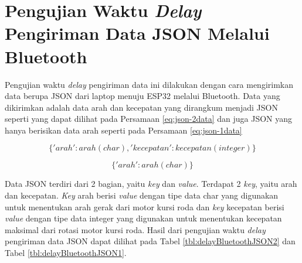 \section{Pengujian Waktu \emph{Delay} Pengiriman Data JSON Melalui Bluetooth}
\label{sec:delayBluetoothJSON}

Pengujian waktu \emph{delay} pengiriman data ini dilakukan dengan cara mengirimkan data berupa JSON dari laptop menuju ESP32 melalui Bluetooth. Data yang dikirimkan adalah data arah dan kecepatan yang dirangkum menjadi JSON seperti yang dapat dilihat pada Persamaan \ref{eq:json-2data} dan juga JSON yang hanya berisikan data arah seperti pada Persamaan \ref{eq:json-1data}

\begin{equation}
  \label{eq:json-2data}
    \{'arah': arah(char), 'kecepatan': kecepatan(integer)\}
\end{equation}

\begin{equation}
  \label{eq:json-1data}
    \{'arah': arah(char)\}
\end{equation}

Data JSON terdiri dari 2 bagian, yaitu \emph{key} dan \emph{value}. Terdapat 2 \emph{key}, yaitu arah dan kecepatan. \emph{Key} arah berisi \emph{value} dengan tipe data char yang digunakan untuk menentukan arah gerak dari motor kursi roda dan \emph{key} kecepatan berisi \emph{value} dengan tipe data integer yang digunakan untuk menentukan kecepatan maksimal dari rotasi motor kursi roda. Hasil dari pengujian waktu \emph{delay} pengiriman data JSON dapat dilihat pada Tabel \ref{tbl:delayBluetoothJSON2} dan Tabel \ref{tbl:delayBluetoothJSON1}.

